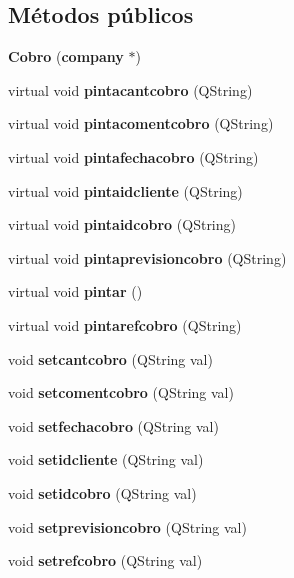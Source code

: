\subsection*{M\'{e}todos p\'{u}blicos}
\begin{CompactItemize}
\item 
{\bf Cobro} ({\bf company} $\ast$)\label{classCobro_a0}

\item 
virtual void {\bf pintacantcobro} (QString)\label{classCobro_a1}

\item 
virtual void {\bf pintacomentcobro} (QString)\label{classCobro_a2}

\item 
virtual void {\bf pintafechacobro} (QString)\label{classCobro_a3}

\item 
virtual void {\bf pintaidcliente} (QString)\label{classCobro_a4}

\item 
virtual void {\bf pintaidcobro} (QString)\label{classCobro_a5}

\item 
virtual void {\bf pintaprevisioncobro} (QString)\label{classCobro_a6}

\item 
virtual void {\bf pintar} ()\label{classCobro_a7}

\item 
virtual void {\bf pintarefcobro} (QString)\label{classCobro_a8}

\item 
void {\bf setcantcobro} (QString val)\label{classCobro_a9}

\item 
void {\bf setcomentcobro} (QString val)\label{classCobro_a10}

\item 
void {\bf setfechacobro} (QString val)\label{classCobro_a11}

\item 
void {\bf setidcliente} (QString val)\label{classCobro_a12}

\item 
void {\bf setidcobro} (QString val)\label{classCobro_a13}

\item 
void {\bf setprevisioncobro} (QString val)\label{classCobro_a14}

\item 
void {\bf setrefcobro} (QString val)\label{classCobro_a15}

\end{CompactItemize}
